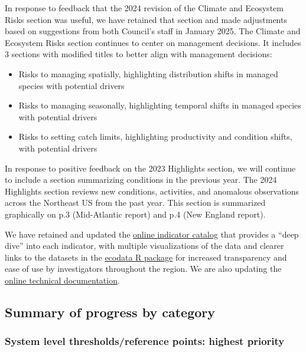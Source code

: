 \documentclass[
  10pt,
]{article}
\providecommand{\tightlist}{%
  \setlength{\itemsep}{0pt}\setlength{\parskip}{0pt}}
\begin{document}
In response to feedback that the 2024 revision of the Climate and
Ecosystem Risks section was useful, we have retained that section and
made adjustments based on suggestions from both Council's staff in
January 2025. The Climate and Ecosystem Risks section continues to
center on management decisions. It includes 3 sections with modified
titles to better align with management decisions:

\begin{itemize}
\tightlist
\item
  Risks to managing spatially, highlighting distribution shifts in
  managed species with potential drivers
\item
  Risks to managing seasonally, highlighting temporal shifts in managed
  species with potential drivers
\item
  Risks to setting catch limits, highlighting productivity and condition
  shifts, with potential drivers
\end{itemize}

In response to positive feedback on the 2023 Highlights section, we will
continue to include a section summarizing conditions in the previous
year. The 2024 Highlights section reviews new conditions, activities,
and anomalous observations across the Northeast US from the past year.
This section is summarized graphically on p.3 (Mid-Atlantic report) and
p.4 (New England report).

We have retained and updated the
\href{https://noaa-edab.github.io/catalog/index.html}{online indicator
catalog} that provides a ``deep dive'' into each indicator, with
multiple visualizations of the data and clearer links to the datasets in
the \href{https://noaa-edab.github.io/ecodata/}{ecodata R package} for
increased transparency and ease of use by investigators throughout the
region. We are also updating the
\href{https://noaa-edab.github.io/tech-doc/}{online technical
documentation}.

\subsection{Summary of progress by
category}\label{summary-of-progress-by-category}

\subsubsection{System level thresholds/reference points: highest
priority}\label{system-level-thresholdsreference-points-highest-priority}
\end{document}
